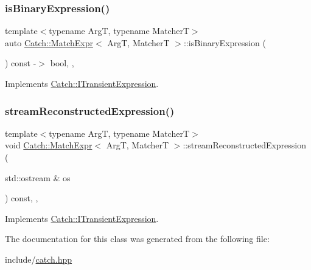 \subsubsection{\texorpdfstring{is\+Binary\+Expression()}{isBinaryExpression()}}
{\footnotesize\ttfamily template$<$typename ArgT, typename MatcherT$>$ \\
auto \mbox{\hyperlink{classCatch_1_1MatchExpr}{Catch\+::\+Match\+Expr}}$<$ ArgT, MatcherT $>$\+::is\+Binary\+Expression (\begin{DoxyParamCaption}{ }\end{DoxyParamCaption}) const -\/$>$ bool\hspace{0.3cm}{\ttfamily [inline]}, {\ttfamily [override]}, {\ttfamily [virtual]}}



Implements \mbox{\hyperlink{structCatch_1_1ITransientExpression_aa93e6bb9392c8c99c695ec9f0ef147dc}{Catch\+::\+I\+Transient\+Expression}}.

\mbox{\label{classCatch_1_1MatchExpr_ad3e41adb597750b2219bb37e51185629}} 
\subsubsection{\texorpdfstring{stream\+Reconstructed\+Expression()}{streamReconstructedExpression()}}
{\footnotesize\ttfamily template$<$typename ArgT, typename MatcherT$>$ \\
void \mbox{\hyperlink{classCatch_1_1MatchExpr}{Catch\+::\+Match\+Expr}}$<$ ArgT, MatcherT $>$\+::stream\+Reconstructed\+Expression (\begin{DoxyParamCaption}\item[{std\+::ostream \&}]{os }\end{DoxyParamCaption}) const\hspace{0.3cm}{\ttfamily [inline]}, {\ttfamily [override]}, {\ttfamily [virtual]}}



Implements \mbox{\hyperlink{structCatch_1_1ITransientExpression_aabe1889df9c6e639a24afb08d8a0fe9e}{Catch\+::\+I\+Transient\+Expression}}.



The documentation for this class was generated from the following file\+:\begin{DoxyCompactItemize}
\item 
include/\mbox{\hyperlink{catch_8hpp}{catch.\+hpp}}\end{DoxyCompactItemize}
